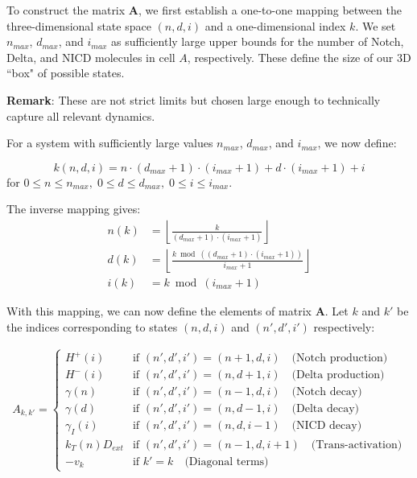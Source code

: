 \documentclass{article}
\begin{document}
\begin{flushleft}
To construct the matrix $\mathbf{A}$, we first establish a one-to-one mapping between the three-dimensional state space $(n,d,i)$ and a one-dimensional index $k$. We set $n_{max}$, $d_{max}$, and $i_{max}$ as sufficiently large upper bounds for the number of Notch, Delta, and NICD molecules in cell $A$, respectively.  These define the size of our 3D ``box" of possible states. 

\textbf{Remark}: These are not strict limits but chosen large enough to technically capture all relevant dynamics.

For a system with sufficiently large values $n_{max}$, $d_{max}$, and $i_{max}$, we now define:

\[
k(n,d,i) = n \cdot (d_{max}+1) \cdot (i_{max}+1) + d \cdot (i_{max}+1) + i
\]
for $0 \leq n \leq n_{max}, \; 0 \leq d \leq d_{max}, \; 0 \leq i \leq i_{max}$.

The inverse mapping gives:
\begin{align*}
n(k) &= \left\lfloor \frac{k}{(d_{max}+1) \cdot (i_{max}+1)} \right\rfloor \\
d(k) &= \left\lfloor \frac{k \bmod ((d_{max}+1) \cdot (i_{max}+1))}{i_{max}+1} \right\rfloor \\
i(k) &= k \bmod (i_{max}+1)
\end{align*}

With this mapping, we can now define the elements of matrix $\mathbf{A}$. Let $k$ and $k'$ be the indices corresponding to states $(n,d,i)$ and $(n',d',i')$ respectively:

\begin{align*}
A_{k,k'} = 
\begin{cases}
H^+(i) & \text{if } (n',d',i') = (n+1,d,i) \quad \text{(Notch production)} \\
H^-(i) & \text{if } (n',d',i') = (n,d+1,i) \quad \text{(Delta production)} \\
\gamma(n) & \text{if } (n',d',i') = (n-1,d,i) \quad \text{(Notch decay)} \\
\gamma(d) & \text{if } (n',d',i') = (n,d-1,i) \quad \text{(Delta decay)} \\
\gamma_I(i) & \text{if } (n',d',i') = (n,d,i-1) \quad \text{(NICD decay)} \\
k_T(n)D_{ext} & \text{if } (n',d',i') = (n-1,d,i+1) \quad \text{(Trans-activation)} \\
-v_k & \text{if } k' = k \quad \text{(Diagonal terms)}
\end{cases}
\end{align*}


\end{flushleft}
\end{document}
